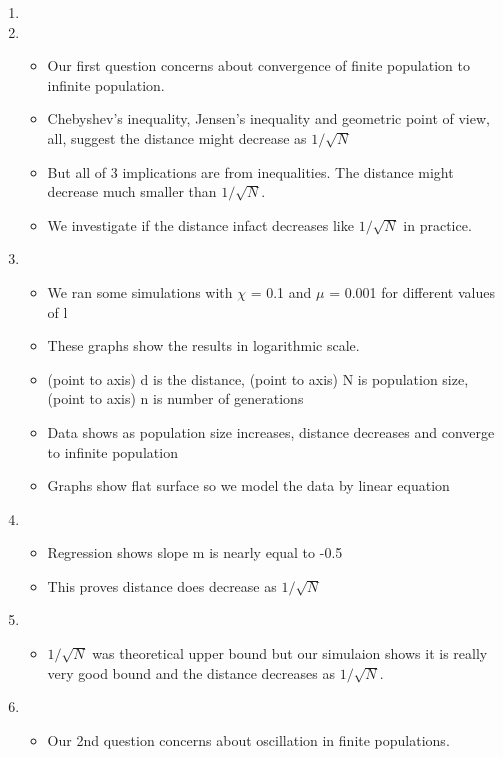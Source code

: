 \documentclass{article}
\begin{document}
\begin{enumerate}
\item {}
  
\item
  \begin{itemize}
  \item Our first question concerns about convergence of finite population to infinite population.
  \item Chebyshev's inequality, Jensen's inequality and geometric point of view, all, suggest the distance might decrease
    as $1/\sqrt{ N}$
  \item But all of 3 implications are from inequalities. The distance
    might decrease much smaller than $1/\sqrt{ N}$.
  \item We investigate if the distance infact decreases like $1/\sqrt{N}$ in practice. 
  \end{itemize}
  
\item
  \begin{itemize}
  \item We ran some simulations with $\chi$ = 0.1 and $\mu$ = 0.001 for
    different values of l
  \item These graphs show the results in logarithmic scale.
  \item  (point to axis) d is the distance, (point to axis) N is population size, (point to axis) n is number of
    generations
  \item Data shows as population size increases, distance decreases and 
    converge to infinite population
  \item Graphs show flat surface so we model the data by linear equation  
  \end{itemize}
    
\item
  \begin{itemize}
  \item Regression shows slope m is nearly equal to -0.5
  \item This proves distance does decrease as $1/\sqrt{N}$  
  \end{itemize}

\item
  \begin{itemize}
  \item $1/\sqrt{N}$ was theoretical upper bound 
  but our simulaion shows it is really very good bound 
  and the distance decreases as $1/\sqrt{N}$. 
  \end{itemize}
    
\item 
  \begin{itemize}
  \item Our 2nd question concerns about oscillation in
    finite populations.
  \end{itemize}
    

\end{enumerate}
\end{document}
